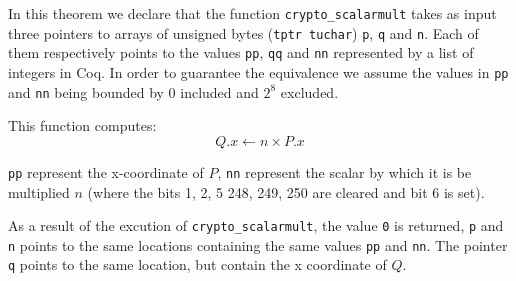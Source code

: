 In this theorem we declare that the function \texttt{crypto\_scalarmult} takes as
input three pointers to arrays of unsigned bytes (\texttt{tptr tuchar}) \texttt{p},
\texttt{q} and \texttt{n}.
Each of them respectively points to the values \texttt{pp},  \texttt{qq} and  \texttt{nn}
represented by a list of integers in Coq. In order to guarantee the equivalence
we assume the values in \texttt{pp} and \texttt{nn} being bounded by $0$ included
and $2^8$ excluded.

This function computes: $$Q.x \leftarrow n \times P.x$$

\texttt{pp} represent the x-coordinate of $P$, \texttt{nn} represent the
scalar by which it is be multiplied $n$ (where the bits 1, 2, 5 248, 249, 250
are cleared and bit 6 is set).

As a result of the excution of \texttt{crypto\_scalarmult}, the value \texttt{0}
is returned, \texttt{p} and \texttt{n} points to the same locations containing
the same values \texttt{pp} and \texttt{nn}.
The pointer \texttt{q} points to the same location, but contain the x coordinate of $Q$.

